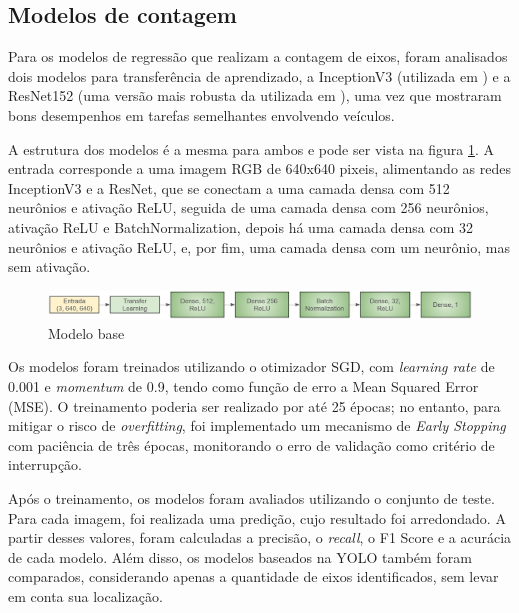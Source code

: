     \subsection{Modelos de contagem}
        Para os modelos de regressão que realizam a contagem de eixos, foram analisados dois modelos para transferência de aprendizado, a InceptionV3 (utilizada em \cite{Almutairi2022}) e a ResNet152 (uma versão mais robusta da utilizada em \cite{iluminacao_adversa}), uma vez que mostraram bons desempenhos em tarefas semelhantes envolvendo veículos.

        A estrutura dos modelos é a mesma para ambos e pode ser vista na figura \ref{fig:modelo_base}. A entrada corresponde a uma imagem RGB de 640x640 pixeis, alimentando as redes InceptionV3 e a ResNet, que se conectam a uma camada densa com 512 neurônios e ativação ReLU, seguida de uma camada densa com 256 neurônios, ativação ReLU e BatchNormalization, depois há uma camada densa com 32 neurônios e ativação ReLU, e, por fim, uma camada densa com um neurônio, mas sem ativação.

        \begin{figure}[!htb]
            \centering
            \includegraphics[width=1\linewidth]{Images/modelo.png}
            \caption{Modelo base}
            \label{fig:modelo_base}
        \end{figure}

        Os modelos foram treinados utilizando o otimizador SGD, com \textit{learning rate} de 0.001 e \textit{momentum} de 0.9, tendo como função de erro a Mean Squared Error (MSE). O treinamento poderia ser realizado por até 25 épocas; no entanto, para mitigar o risco de \textit{overfitting}, foi implementado um mecanismo de \textit{Early Stopping} com paciência de três épocas, monitorando o erro de validação como critério de interrupção.
        
        Após o treinamento, os modelos foram avaliados utilizando o conjunto de teste. Para cada imagem, foi realizada uma predição, cujo resultado foi arredondado. A partir desses valores, foram calculadas a precisão, o \textit{recall}, o F1 Score e a acurácia de cada modelo. Além disso, os modelos baseados na YOLO também foram comparados, considerando apenas a quantidade de eixos identificados, sem levar em conta sua localização.
    
